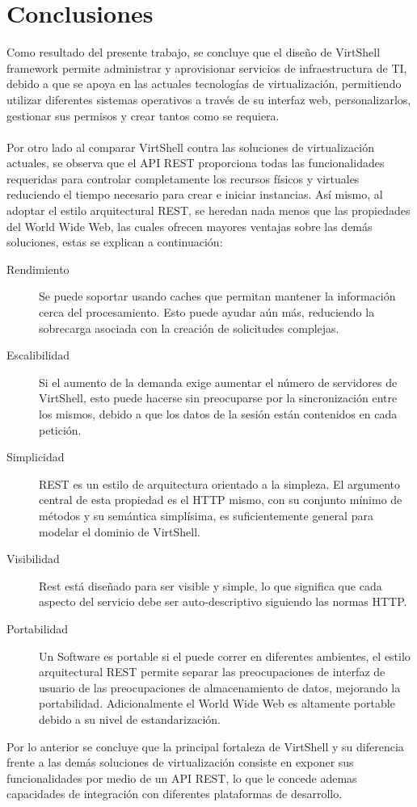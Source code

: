 \chapter{Conclusiones}
\label{capconslusiones}

Como resultado del presente trabajo, se concluye que el diseño de VirtShell framework permite administrar y aprovisionar servicios de infraestructura de TI, debido a que se apoya en las actuales tecnologías de virtualización, permitiendo utilizar diferentes sistemas operativos a través de su interfaz web, personalizarlos, gestionar sus permisos y crear tantos como se requiera.\\
\\
Por otro lado al comparar VirtShell contra las soluciones de virtualización actuales, se observa que el API REST proporciona todas las funcionalidades requeridas para controlar completamente los recursos físicos y virtuales reduciendo el tiempo necesario para crear e iniciar instancias. Así mismo, al adoptar el estilo arquitectural REST, se heredan nada menos que las propiedades del World Wide Web, las cuales ofrecen mayores ventajas sobre las demás soluciones, estas se explican a continuación:

\begin{description}
\item [Rendimiento] Se puede soportar usando caches que permitan mantener la información cerca del procesamiento. Esto puede ayudar aún más, reduciendo la sobrecarga asociada con la creación de solicitudes complejas.
\item [Escalibilidad] Si el aumento de la demanda exige aumentar el número de servidores de VirtShell, esto puede hacerse sin preocuparse por la sincronización entre los mismos, debido a que los datos de la sesión están contenidos en cada petición.
\item [Simplicidad] REST es un estilo de arquitectura orientado a la simpleza. El argumento  central de esta propiedad es el HTTP mismo, con su conjunto mínimo de métodos y su semántica simplísima, es suficientemente general para modelar el dominio de VirtShell.
\item [Visibilidad] Rest está diseñado para ser visible y simple, lo que significa que cada aspecto del servicio debe ser auto-descriptivo siguiendo las normas HTTP.
\item [Portabilidad] Un Software es portable si el puede correr en diferentes ambientes, el estilo arquitectural REST permite separar las preocupaciones de interfaz de usuario de las preocupaciones de almacenamiento de datos, mejorando la portabilidad. Adicionalmente el World Wide Web es altamente portable debido a su nivel de estandarización.
\end{description}

Por lo anterior se concluye que la principal fortaleza de VirtShell y su diferencia frente a
 las demás soluciones de virtualización consiste en exponer sus funcionalidades por medio de un API REST, lo que le concede ademas capacidades de integración con diferentes plataformas de desarrollo.